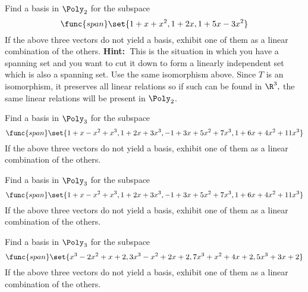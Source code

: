 \begin{enumialphparenastyle}
\begin{ex} Find a basis in $\Poly_{2}$ for the subspace 
\begin{equation*}
\func{span}\set{1+x+x^{2},1+2x,1+5x-3x^{2}}
\end{equation*}
If the above three vectors do not yield a basis, exhibit one of them as a
linear combination of the others. \textbf{Hint:\ }This is the situation in
which you have a spanning set and you want to cut it down to form a linearly
independent set which is also a spanning set. Use the same isomorphism
above. Since $T$ is an isomorphism, it preserves all linear relations so if
such can be found in $\R^{3},$ the same linear relations will be
present in $\Poly_{2}$.
\end{ex}


\begin{ex} Find a basis in $\Poly_{3}$ for the subspace 
\begin{equation*}
\func{span}\set{
1+x-x^{2}+x^{3},1+2x+3x^{3},-1+3x+5x^{2}+7x^{3},1+6x+4x^{2}+11x^{3}}
\end{equation*}
If the above three vectors do not yield a basis, exhibit one of them as a
linear combination of the others.
\end{ex}


\begin{ex} Find a basis in $\Poly_{3}$ for the subspace 
\begin{equation*}
\func{span}\set{
1+x-x^{2}+x^{3},1+2x+3x^{3},-1+3x+5x^{2}+7x^{3},1+6x+4x^{2}+11x^{3}}
\end{equation*}
If the above three vectors do not yield a basis, exhibit one of them as a
linear combination of the others.
\end{ex}


\begin{ex} Find a basis in $\Poly_{3}$ for the subspace 
\begin{equation*}
\func{span}\set{
x^{3}-2x^{2}+x+2,3x^{3}-x^{2}+2x+2,7x^{3}+x^{2}+4x+2,5x^{3}+3x+2}
\end{equation*}
If the above three vectors do not yield a basis, exhibit one of them as a
linear combination of the others.
\end{ex}



\end{enumialphparenastyle}
